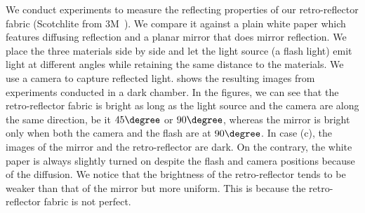 We conduct experiments to measure the reflecting properties of our retro-reflector fabric (Scotchlite from 3M~\cite{rrsheet}). We compare it against a plain white paper which features diffusing reflection and a planar mirror that does mirror reflection. We place the three materials side by side and let the light source (a flash light) emit light at different angles while retaining the same distance to the materials. We use a camera to capture reflected light.  shows the resulting images from experiments conducted in a dark chamber. In the figures, we can see that the retro-reflector fabric is bright as long as the light source and the camera are along the same direction, be it $45\degree$ or $90\degree$, whereas the mirror is bright only when both the camera and the flash are at $90\degree$. In case (c), the images of the mirror and the retro-reflector are dark. On the contrary, the white paper is always slightly turned on despite the flash and camera positions because of the diffusion.  
We notice that the brightness of the retro-reflector tends to be weaker than that of the mirror but more uniform. This is because the retro-reflector fabric is not perfect. 


